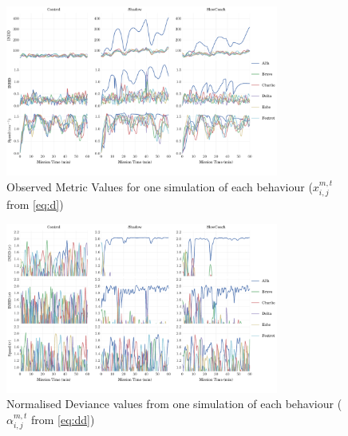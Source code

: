 \documentclass[conference]{IEEEtran}
\begin{document}
\begin{figure}
  \centering
  \includegraphics[width=0.8\textwidth]{Metric_Values}
  \caption{Observed Metric Values for one simulation of each behaviour ($x_{i,j}^{m,t}$ from \eqref{eq:d})}
  \label{fig:metric_values}
\end{figure}


\begin{figure}
  \centering
  \includegraphics[width=0.8\textwidth]{Metric_Sigma_Deviance}
  \caption{Normalised Deviance values from one simulation of each behaviour ($\alpha_{i,j}^{m,t}$ from \eqref{eq:dd})}
  \label{fig:deviance_values}
\end{figure}
\end{document}
